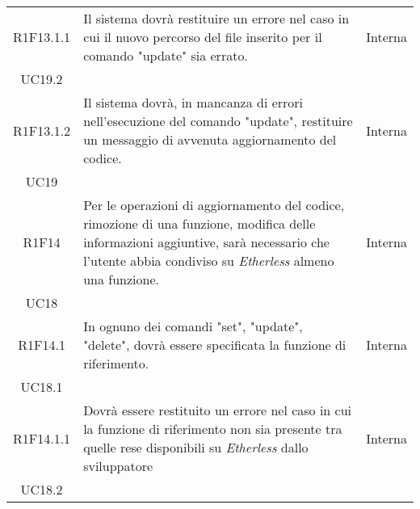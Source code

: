 \begin{longtable}{|c|p{8cm}|C{2cm}|}
	R1F13.1.1 & Il sistema dovrà restituire un errore nel caso in cui il nuovo percorso del file inserito per il comando "update" sia errato. & \centering Interna \\ UC19.2 \tabularnewline
	
	R1F13.1.2 & Il sistema dovrà, in mancanza di errori nell'esecuzione del comando "update", restituire un messaggio di avvenuta aggiornamento del codice. & \centering Interna \\ UC19 \tabularnewline
	
	R1F14 &  Per le operazioni di aggiornamento del codice, rimozione di una funzione, modifica delle informazioni aggiuntive, sarà necessario che l'utente abbia condiviso su \textit{Etherless} almeno una funzione. & \centering Interna \\ UC18 \tabularnewline
	
	R1F14.1 &  In ognuno dei comandi "set", "update", "delete", dovrà essere specificata la funzione di riferimento. & \centering Interna \\ UC18.1 \tabularnewline
	
	R1F14.1.1 &  Dovrà essere restituito un errore nel caso in cui la funzione di riferimento non sia presente tra quelle rese disponibili su \textit{Etherless} dallo sviluppatore & \centering Interna \\ UC18.2 \tabularnewline
	\hline
	
\end{longtable}